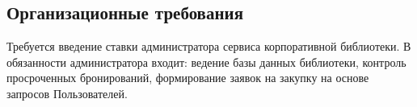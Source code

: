 \documentclass[requirements.tex]{subfiles}
\begin{document}
\subsection{Организационные требования}
\par
Требуется введение ставки администратора сервиса корпоративной библиотеки. В обязанности администратора входит: ведение базы данных библиотеки, контроль просроченных бронирований, формирование заявок на закупку на основе запросов Пользователей.
\end{document}
